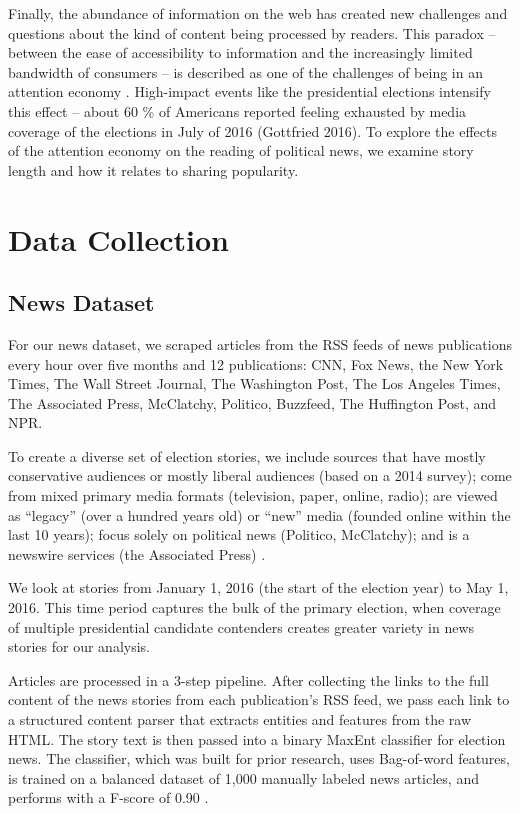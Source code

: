 \documentclass[letterpaper]{article}
\begin{document}
Finally, the abundance of information on the web has created new challenges and questions about the kind of content being processed by readers. This paradox -- between the ease of accessibility to information and the increasingly limited bandwidth of consumers -- is described as one of the challenges of being in an attention economy \cite{goldhaber1997attention}. High-impact events like the presidential elections intensify this effect -- about 60 \% of Americans reported feeling exhausted by media coverage of the elections in July of 2016 (Gottfried 2016). To explore the effects of the attention economy on the reading of political news, we examine story length and how it relates to sharing popularity.
 
\section{Data Collection} 

\subsection{News Dataset}
For our news dataset, we scraped articles from the RSS feeds of news publications every hour over five months and 12 publications: CNN, Fox News, the New York Times, The Wall Street Journal, The Washington Post, The Los Angeles Times, The Associated Press, McClatchy, Politico, Buzzfeed, The Huffington Post, and NPR.

To create a diverse set of election stories, we include sources that have mostly conservative audiences or mostly liberal audiences (based on a 2014 survey); come from mixed primary media formats (television, paper, online, radio); are viewed as ``legacy'' (over a hundred years old) or ``new'' media (founded online within the last 10 years); focus solely on political news (Politico, McClatchy); and is a newswire services (the Associated Press) \cite{PoliticalPolarization}. 
  
We look at stories from January 1, 2016 (the start of the election year) to May 1, 2016. This time period captures the bulk of the primary election, when coverage of multiple presidential candidate contenders creates greater variety in news stories for our analysis.

Articles are processed in a 3-step pipeline. After collecting the links to the full content of the news stories from each publication's RSS feed, we pass each link to a structured content parser that extracts entities and features from the raw HTML. The story text is then passed into a binary MaxEnt classifier for election news. The classifier, which was built for prior research, uses Bag-of-word features, is trained on a balanced dataset of 1,000 manually labeled news articles, and performs with a F-score of 0.90 \cite{vijayaraghavan-thesis}. 
\end{document}
